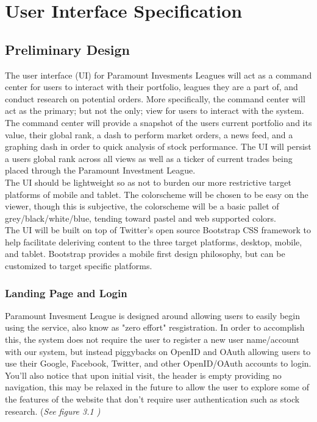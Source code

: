 \chapter{User Interface Specification}
\label{uispec}
\section{Preliminary Design}

The user interface (UI) for Paramount Invesments Leagues will act as a command center
for users to interact with their portfolio, leagues they are a part of, and conduct
research on potential orders. More specifically, the command center will act as the
primary; but not the only; view for users to interact with the system.  The command
center will provide a snapshot of the users current portfolio and its value, their
global rank, a dash to perform market orders, a news feed, and a graphing dash in order
to quick analysis of stock performance.  The UI will persist a users global rank across
all views as well as a ticker of current trades being placed through the Paramount
Investment League.\\

The UI should be lightweight so as not to burden our more restrictive target platforms
of mobile and tablet.  The colorscheme will be chosen to be easy on the viewer, though
this is subjective, the colorscheme will be a basic pallet of grey/black/white/blue,
tending toward pastel and web supported colors.\\

The UI will be built on top of Twitter's open source Bootstrap CSS\cite{wiki:boot}
framework to help
facilitate deleriving content to the three target platforms, desktop, mobile, and tablet.
Bootstrap provides a mobile first design philosophy, but can be customized to target
specific platforms.\\

\subsection{Landing Page and Login}

Paramount Invesment League is designed around allowing users to easily begin using the
service, also know as "zero effort" resgistration. In order to accomplish this, the
system does not require the user to register a new user name/account with our system,
but instead piggybacks on OpenID\cite{wiki:open} and OAuth\cite{wiki:oauth} allowing users to
use their Google,
Facebook, Twitter, and other OpenID/OAuth accounts to login. You'll also notice that
upon initial visit, the header is empty providing no navigation, this may be relaxed in
the future to allow the user to explore some of the features of the website that don't
require user authentication such as stock research. (\em See figure 3.1 \em)\\

